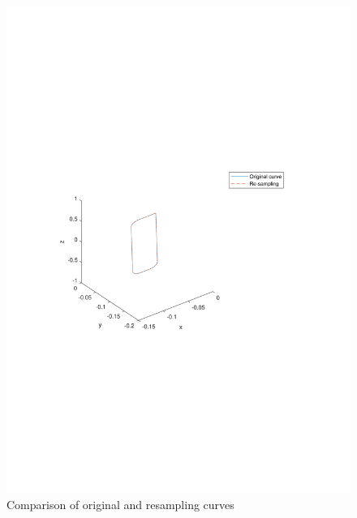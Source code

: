 \begin{figure}[h!]
	\centering
        \vspace{-3cm}
        \setlength{\abovecaptionskip}{-7.5cm}
	\includegraphics[width=\textwidth]{03_images/sample_point.pdf}
	\caption{Comparison of original and resampling curves}
	\label{fig:main:samplepoints}
\end{figure}
